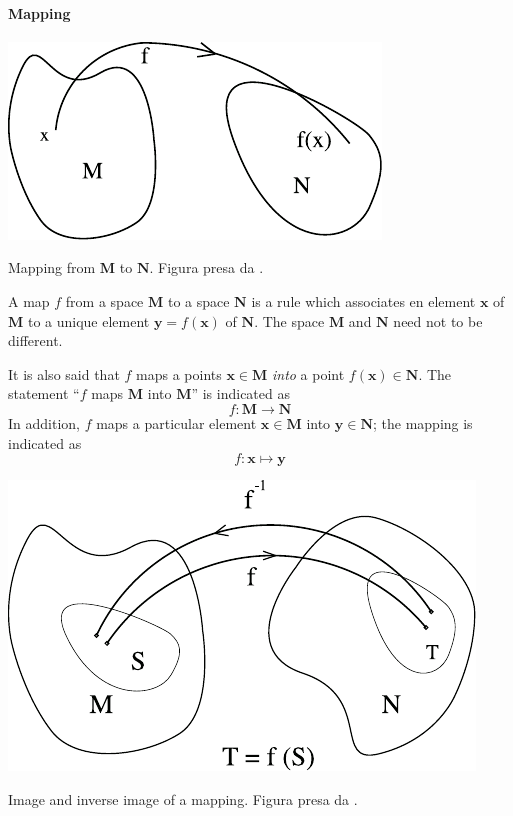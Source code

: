 \documentclass[../main.tex]{subfiles}
\begin{document}
\paragraph{Mapping }
\begin{marginfigure}[17mm]
	\includegraphics{images/mappa_vettoriale.pdf}
	\caption[Mapping from $\mathbf{M}$ to $\mathbf{M}$]{Mapping from $\mathbf{M}$ to $\mathbf{N}$. Figura presa da \cite{ferrari2020general}.}
\end{marginfigure}
\begin{definition}
A map $f$ from a space $\mathbf{M}$ to a space $\mathbf{N}$ is a rule which associates en element $\mathbf{x}$ of $\mathbf{M}$ to a unique element $\mathbf{y}=f(\mathbf{x})$ of $\mathbf{N}$. The space $\mathbf{M}$ and $\mathbf{N}$ need not to be different.
\end{definition}
It is also said that $f$ maps a points $\mathbf{x} \in \mathbf{M}$ \textit{into} a point $f(\mathbf{x}) \in \mathbf{N}$. The statement “$f$ maps $\mathbf{M}$ into $\mathbf{M}$” is indicated as \[f : \mathbf{M} \rightarrow  \mathbf{N}\]
In addition, $f$ maps a particular element $\mathbf{x} \in \mathbf{M}$ into $\mathbf{y} \in \mathbf{N}$; the mapping is indicated as
\[
f : \mathbf{x} \mapsto  \mathbf{y}
\]
\begin{marginfigure}
	\includegraphics{images/immagine_e_inversa_mappa.pdf}
	\caption[Image and inverse image of a mapping.
]{Image and inverse image of a mapping. Figura presa da \cite{ferrari2020general}.}
\end{marginfigure} 
\end{document}

